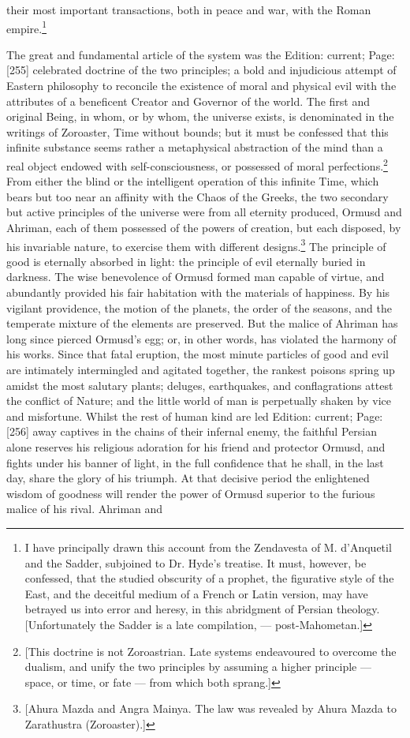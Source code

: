 their most important transactions, both in peace and war, with the Roman empire.\footnote{I have principally drawn this account from the Zendavesta of M. d\texthebrew{}’Anquetil and the Sadder, subjoined to Dr. Hyde\texthebrew{}’s treatise. It must, however, be confessed, that the studied obscurity of a prophet, the figurative style of the East, and the deceitful medium of a French or Latin version, may have betrayed us into error and heresy, in this abridgment of Persian theology. [Unfortunately the Sadder is a late compilation, \texthebrew{—} post-Mahometan.]}

The great and fundamental article of the system was the Edition: current; Page: [255] celebrated doctrine of the two principles; a bold and injudicious attempt of Eastern philosophy to reconcile the existence of moral and physical evil with the attributes of a beneficent Creator and Governor of the world. The first and original Being, in whom, or by whom, the universe exists, is denominated in the writings of Zoroaster, Time without bounds; but it must be confessed that this infinite substance seems rather a metaphysical abstraction of the mind than a real object endowed with self-consciousness, or possessed of moral perfections.\footnote{[This doctrine is not Zoroastrian. Late systems endeavoured to overcome the dualism, and unify the two principles by assuming a higher principle \texthebrew{—} space, or time, or fate \texthebrew{—} from which both sprang.]} From either the blind or the intelligent operation of this infinite Time, which bears but too near an affinity with the Chaos of the Greeks, the two secondary but active principles of the universe were from all eternity produced, Ormusd and Ahriman, each of them possessed of the powers of creation, but each disposed, by his invariable nature, to exercise them with different designs.\footnote{[Ahura Mazda and Angra Mainya. The law was revealed by Ahura Mazda to Zarathustra (Zoroaster).]} The principle of good is eternally absorbed in light: the principle of evil eternally buried in darkness. The wise benevolence of Ormusd formed man capable of virtue, and abundantly provided his fair habitation with the materials of happiness. By his vigilant providence, the motion of the planets, the order of the seasons, and the temperate mixture of the elements are preserved. But the malice of Ahriman has long since pierced Ormusd\texthebrew{}’s egg; or, in other words, has violated the harmony of his works. Since that fatal eruption, the most minute particles of good and evil are intimately intermingled and agitated together, the rankest poisons spring up amidst the most salutary plants; deluges, earthquakes, and conflagrations attest the conflict of Nature; and the little world of man is perpetually shaken by vice and misfortune. Whilst the rest of human kind are led Edition: current; Page: [256] away captives in the chains of their infernal enemy, the faithful Persian alone reserves his religious adoration for his friend and protector Ormusd, and fights under his banner of light, in the full confidence that he shall, in the last day, share the glory of his triumph. At that decisive period the enlightened wisdom of goodness will render the power of Ormusd superior to the furious malice of his rival. Ahriman and 